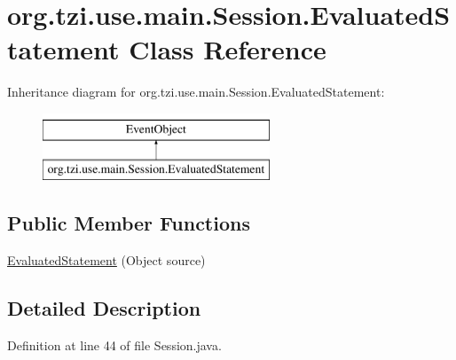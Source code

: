 \hypertarget{classorg_1_1tzi_1_1use_1_1main_1_1_session_1_1_evaluated_statement}{\section{org.\-tzi.\-use.\-main.\-Session.\-Evaluated\-Statement Class Reference}
\label{classorg_1_1tzi_1_1use_1_1main_1_1_session_1_1_evaluated_statement}
}
Inheritance diagram for org.\-tzi.\-use.\-main.\-Session.\-Evaluated\-Statement\-:\begin{figure}[H]
\begin{center}
\leavevmode
\includegraphics[height=2.000000cm]{classorg_1_1tzi_1_1use_1_1main_1_1_session_1_1_evaluated_statement}
\end{center}
\end{figure}
\subsection*{Public Member Functions}
\begin{DoxyCompactItemize}
\item 
\hyperlink{classorg_1_1tzi_1_1use_1_1main_1_1_session_1_1_evaluated_statement_a9769d9aa226ac47e18849f41fa6d98a9}{Evaluated\-Statement} (Object source)
\end{DoxyCompactItemize}


\subsection{Detailed Description}


Definition at line 44 of file Session.\-java.



